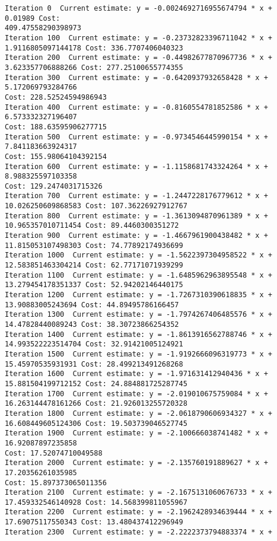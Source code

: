 \documentclass[11pt]{article}
\begin{document}
    \begin{Verbatim}[commandchars=\\\{\}]
Iteration 0  Current estimate: y = -0.0024692716955674794 * x + 0.01989 Cost:
409.47558290398973
Iteration 100  Current estimate: y = -0.23732823396711042 * x +
1.9116805097144178 Cost: 336.7707406040323
Iteration 200  Current estimate: y = -0.44982677870967736 * x +
3.623357706888266 Cost: 277.25100655774355
Iteration 300  Current estimate: y = -0.6420937932658428 * x + 5.172069793284766
Cost: 228.52524594986943
Iteration 400  Current estimate: y = -0.8160554781852586 * x + 6.573332327196407
Cost: 188.63595906277715
Iteration 500  Current estimate: y = -0.9734546445990154 * x + 7.841183663924317
Cost: 155.98064104392154
Iteration 600  Current estimate: y = -1.1158681743324264 * x + 8.988325597103358
Cost: 129.2474031715326
Iteration 700  Current estimate: y = -1.2447228176779612 * x +
10.026250609868583 Cost: 107.36226927912767
Iteration 800  Current estimate: y = -1.3613094870961389 * x +
10.965357010711454 Cost: 89.4460300351272
Iteration 900  Current estimate: y = -1.4667961900438482 * x +
11.815053107498303 Cost: 74.77892174936699
Iteration 1000  Current estimate: y = -1.5622397304958522 * x +
12.583851463304214 Cost: 62.77171071939299
Iteration 1100  Current estimate: y = -1.6485962963895548 * x +
13.279454178351337 Cost: 52.94202146440175
Iteration 1200  Current estimate: y = -1.7267310390618835 * x +
13.90883005243694 Cost: 44.89495786166457
Iteration 1300  Current estimate: y = -1.7974267406485576 * x +
14.47828440089243 Cost: 38.30723866254352
Iteration 1400  Current estimate: y = -1.8613916562788746 * x +
14.993522223514704 Cost: 32.91421005124921
Iteration 1500  Current estimate: y = -1.9192666096319773 * x +
15.45970535931931 Cost: 28.499213491268268
Iteration 1600  Current estimate: y = -1.971631412940436 * x +
15.881504199712152 Cost: 24.884881725287745
Iteration 1700  Current estimate: y = -2.019010675759084 * x +
16.263144478161266 Cost: 21.926013255720328
Iteration 1800  Current estimate: y = -2.0618790606934327 * x +
16.608449605124306 Cost: 19.503739046527745
Iteration 1900  Current estimate: y = -2.100666038741482 * x + 16.92087897235858
Cost: 17.52074710049588
Iteration 2000  Current estimate: y = -2.135760191889627 * x + 17.20356261035985
Cost: 15.897373065011356
Iteration 2100  Current estimate: y = -2.1675131060676733 * x +
17.459332546140928 Cost: 14.568399811055967
Iteration 2200  Current estimate: y = -2.1962428934639444 * x +
17.69075117550343 Cost: 13.480437412296949
Iteration 2300  Current estimate: y = -2.2222373794883374 * x +

\end{Verbatim}
\end{document}
